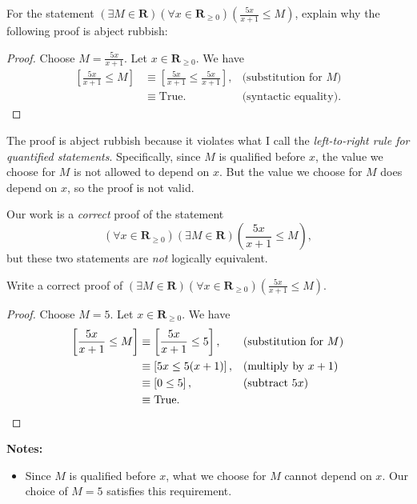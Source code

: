 \documentclass[12pt,fleqn,answers]{exam}
\newcommand{\reals}{\mathbf{R}}
\newcommand{\true}{\mathrm{True}}
\renewenvironment{solution}
  {\begin{shaded*}} %
  {\end{shaded*}}   %
\begin{document}
\begin{questions}

\question[10] For the statement  \(\left(\exists M \in \reals  \right)
\left(\forall x \in \reals_{\geq 0} \right) \left(\frac{5 x}{x+1} \leq M \right)\), explain why
the following proof is abject rubbish:
\begin{proof} Choose $M = \frac{5 x}{x+1}$. Let  $x \in \reals_{\geq 0}$. We have
\begin{align*}
 \left[\frac{5 x}{x+1} \leq M  \right] &\equiv
 \left[\frac{5 x}{x+1} \leq  \frac{5 x}{x+1}  \right],  &\mbox{(substitution for $M$)} \\
 &\equiv \mbox{True}. &\mbox{(syntactic equality)}. 
\end{align*}  \qedhere
\end{proof}


\begin{solution} The proof is abject rubbish because it violates
  what I call the \emph{left-to-right rule for quantified statements}. 
  Specifically, since $M$ is qualified before $x$,
  the value we choose for $M$ is not allowed to depend on $x$.
  But the value we choose for $M$ does depend on $x$, so the proof
  is not valid.

  \quad Our work is a \emph{correct} proof of the statement 
  \begin{equation}
  \left(\forall x \in \reals_{\geq 0} \right) \left(\exists M \in \reals  \right)
 \left(\frac{5 x}{x+1} \leq M \right),
\end{equation}
but these two statements are \emph{not} logically equivalent.
 
\end{solution}



\question[10] Write a correct proof of \(\left(\exists M \in \reals\right)
\left(\forall x \in \reals_{\geq 0} \right) \left(\frac{5 x}{x+1} \leq  M \right)\).

\begin{solution} 

\begin{proof} Choose $M = 5$. Let $x \in \reals_{\geq 0}$. 
  We have
  \begin{align*}
     \left[\frac{5 x}{x+1} \leq  M \right]
       &\equiv \left[\frac{5 x}{x+1} \leq  5 \right], &&\text{(substitution for $M$)} \\
       &\equiv \left[5 x \leq  5 (x+1) \right], &&\text{(multiply by $x+1$)} \\
       &\equiv \left[ 0 \leq 5 \right], &&\text{(subtract $5 x$)} \qedhere \\
       &\equiv \true.
  \end{align*}
\end{proof}
\textbf{Notes:}
\begin{itemize}
\item Since $M$ is qualified before $x$, what we choose for $M$ cannot depend
on $x$. Our choice of $M = 5$ satisfies this requirement.


\end{itemize}
\end{solution}
\end{questions}
\end{document}
